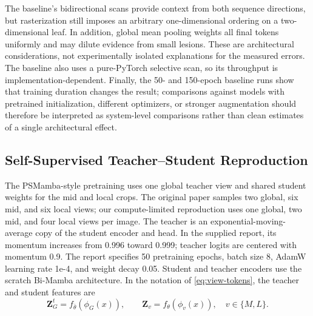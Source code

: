 \documentclass[conference]{IEEEtran}
\begin{document}
The baseline's bidirectional scans provide context from both sequence directions, but rasterization still imposes an arbitrary one-dimensional ordering on a two-dimensional leaf. In addition, global mean pooling weights all final tokens uniformly and may dilute evidence from small lesions. These are architectural considerations, not experimentally isolated explanations for the measured errors. The baseline also uses a pure-PyTorch selective scan, so its throughput is implementation-dependent. Finally, the 50- and 150-epoch baseline runs show that training duration changes the result; comparisons against models with pretrained initialization, different optimizers, or stronger augmentation should therefore be interpreted as system-level comparisons rather than clean estimates of a single architectural effect.

\subsection{Self-Supervised Teacher--Student Reproduction}
The PSMamba-style pretraining uses one global teacher view and shared student weights for the mid and local crops. The original paper samples two global, six mid, and six local views; our compute-limited reproduction uses one global, two mid, and four local views per image. The teacher is an exponential-moving-average copy of the student encoder and head. In the supplied report, its momentum increases from 0.996 toward 0.999; teacher logits are centered with momentum 0.9. The report specifies 50 pretraining epochs, batch size 8, AdamW learning rate 1e-4, and weight decay 0.05. Student and teacher encoders use the scratch Bi-Mamba architecture. In the notation of \eqref{eq:view-tokens}, the teacher and student features are
\begin{equation}
    \mathbf{Z}^{t}_G=f_{\bar{\theta}}(\phi_G(x)),\qquad
    \mathbf{Z}_v=f_{\theta}(\phi_v(x)),\quad v\in\{M,L\}.
    \label{eq:teacher-features}
\end{equation}
\end{document}
